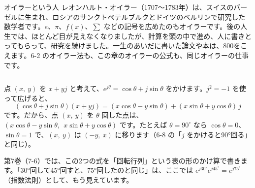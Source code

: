 \begin{column}{オイラーという人}
レオンハルト・オイラー（1707〜1783年）は、スイスのバーゼルに生まれ、ロシアのサンクトペテルブルクとドイツのベルリンで研究した数学者です。$e$、$\pi$、$f(x)$、$\sum$ などの記号を広めたのもオイラーです。後の人生では、ほとんど目が見えなくなりましたが、計算を頭の中で進め、人に書きとってもらって、研究を続けました。一生のあいだに書いた論文や本は、800をこえます。6-2 のオイラー法も、この章のオイラーの公式も、同じオイラーの仕事です。
\end{column}

\begin{motto}[4]
点 $(x,\ y)$ を $x+yj$ と考えて、$e^{j\theta}=\cos\theta+j\sin\theta$ をかけます。$j^2=-1$ を使って広げると、
\[ (\cos\theta+j\sin\theta)(x+yj)=(x\cos\theta-y\sin\theta)+(x\sin\theta+y\cos\theta)\,j \]
です。だから、点 $(x,\ y)$ を $\theta$ 回した点は、$(x\cos\theta-y\sin\theta,\ \ x\sin\theta+y\cos\theta)$ です。たとえば $\theta=90^\circ$ なら $\cos\theta=0$、$\sin\theta=1$ で、$(x,\ y)$ は $(-y,\ x)$ に移ります（6-8 の「$j$ をかけると90°回る」と同じ）。

第7巻（7-6）では、この2つの式を「回転行列」という表の形のかけ算で書きます。「30°回して45°回すと、75°回したのと同じ」は、ここでは $e^{j30^\circ}e^{j45^\circ}=e^{j75^\circ}$（指数法則）として、もう見えています。
\end{motto}


